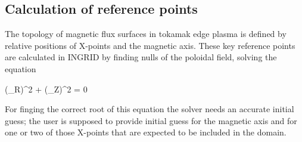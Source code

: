 \subsection{Calculation of reference points}

The topology of magnetic flux surfaces in tokamak edge plasma is
defined by relative positions of X-points and the magnetic axis. These
key reference points are calculated in INGRID by finding nulls of the
poloidal field, solving the equation

\beq
(\Psi_R)^2 + (\Psi_Z)^2 = 0
\eeq

For finging the correct root of this equation the solver needs an
accurate initial guess; the user is supposed to provide initial guess
for the magnetic axis and for one or two of those X-points that are
expected to be included in the domain.

